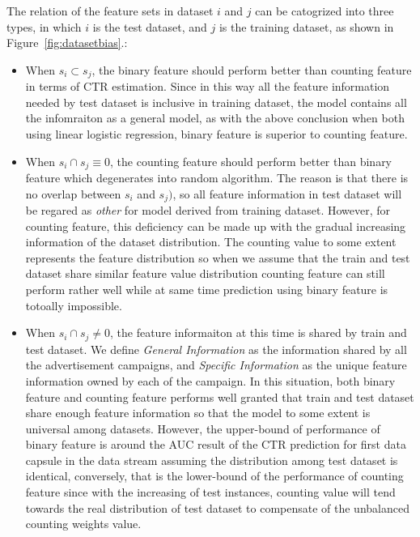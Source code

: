 The relation of the feature sets in dataset \(i\) and \(j\) can be catogrized into three types, in which \(i\) is the test dataset, and \(j\) is the training dataset, as shown in Figure~\ref{fig:datasetbias}.:
\begin{itemize}
\item When \(s_i \subset s_j\), the binary feature should perform better than counting feature in terms of CTR estimation. Since in this way all the feature information needed by test dataset is inclusive in training dataset, the model contains all the infomraiton as a general model, as with the above conclusion when both using linear logistic regression, binary feature is superior to counting feature.  
\item When \(s_i \cap s_j \equiv 0\), the counting feature should perform better than binary feature which degenerates into random algorithm. The reason is that there is no overlap between \(s_i\) and \(s_j)\), so all feature information in test dataset will be regared as \textit{other} for model derived from training dataset. However, for counting feature, this deficiency can be made up with the gradual increasing information of the dataset distribution. The counting value to some extent represents the feature distribution so when we assume that the train and test dataset share similar feature value distribution counting feature can still perform rather well while at same time prediction using binary feature is totoally impossible.
\item When \(s_i \cap s_j \neq 0\), the feature informaiton at this time is shared by train and test dataset. We define \textit{General Information} as the information shared by all the advertisement campaigns, and \textit{Specific Information} as the unique feature information owned by each of the campaign. In this situation, both binary feature and counting feature performs well granted that train and test dataset share enough feature information so that the model to some extent is universal among datasets. However, the upper-bound of performance of binary feature is around the AUC result of the CTR prediction for first data capsule in the data stream assuming the distribution among test dataset is identical, conversely, that is the lower-bound of the performance of counting feature since with the increasing of test instances, counting value will tend towards the real distribution of test dataset to compensate of the unbalanced counting weights value. 
\end{itemize}



